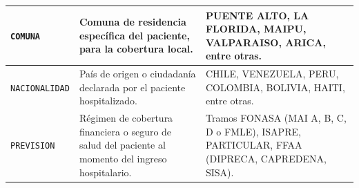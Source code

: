 \begin{table}[htbp]
\begin{tabular}{|l|l|l|}
\parbox[t]{2.55cm}{\texttt{COMUNA}} & \parbox[t]{6.15cm}{Comuna de residencia específica del paciente, para la cobertura local.} & \parbox[t]{4.05cm}{PUENTE ALTO, LA FLORIDA, MAIPU, VALPARAISO, ARICA, entre otras.} \\ \hline
\parbox[t]{2.55cm}{\texttt{NACIONALIDAD}} & \parbox[t]{6.15cm}{País de origen o ciudadanía declarada por el paciente hospitalizado.} & \parbox[t]{4.05cm}{CHILE, VENEZUELA, PERU, COLOMBIA, BOLIVIA, HAITI, entre otras.} \\ \hline
\parbox[t]{2.55cm}{\texttt{PREVISION}} & \parbox[t]{6.15cm}{Régimen de cobertura financiera o seguro de salud del paciente al momento del ingreso hospitalario.} & \parbox[t]{4.05cm}{Tramos FONASA (MAI A, B, C, D o FMLE), ISAPRE, PARTICULAR, FFAA (DIPRECA, CAPREDENA, SISA).} \\ \hline
\end{tabular}
\end{table}
